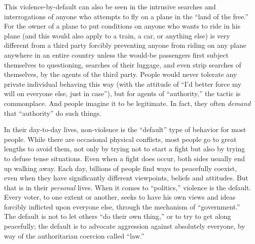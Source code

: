 \documentclass{book}
\begin{document}
This violence-by-default can also be seen in the intrusive searches and interrogations of anyone who attempts to fly on a plane in the \enquote{land of the free.} For the owner of a plane to put conditions on anyone who wants to ride in his plane (and this would also apply to a train, a car, or anything else) is very different from a third party forcibly preventing anyone from riding on any plane anywhere in an entire country unless the would-be passengers first subject themselves to questioning, searches of their luggage, and even strip searches of themselves, by the agents of the third party. People would never tolerate any private individual behaving this way (with the attitude of \enquote{I'd better force my will on everyone else, just in case}), but for agents of \enquote{authority,} the tactic is commonplace. And people imagine it to be legitimate. In fact, they often \emph{demand} that \enquote{authority} do such things.

In their day-to-day lives, non-violence is the \enquote{default} type of behavior for most people. While there are occasional physical conflicts, most people go to great lengths to avoid them, not only by trying not to start a fight but also by trying to defuse tense situations. Even when a fight does occur, both sides usually end up walking away. Each day, billions of people find ways to peacefully coexist, even when they have significantly different viewpoints, beliefs and attitudes. But that is in their \emph{personal} lives. When it comes to \enquote{politics,} violence is the default. Every voter, to one extent or another, seeks to have his own views and ideas forcibly inflicted upon everyone else, through the mechanism of \enquote{government.} The default is not to let others \enquote{do their own thing,} or to try to get along peacefully; the default is to advocate aggression against absolutely everyone, by way of the authoritarian coercion called \enquote{law.}
\end{document}
